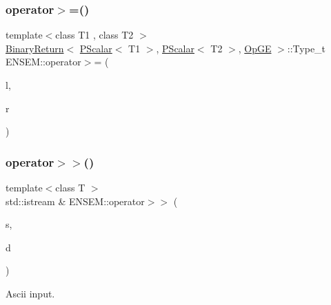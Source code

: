 \mbox{\label{group__primscalar_ga149cf6b2bcbe466aae6c6e90ee265c50}} 
\subsubsection{\texorpdfstring{operator$>$=()}{operator>=()}}
{\footnotesize\ttfamily template$<$class T1 , class T2 $>$ \\
\mbox{\hyperlink{structENSEM_1_1BinaryReturn}{Binary\+Return}}$<$ \mbox{\hyperlink{classENSEM_1_1PScalar}{P\+Scalar}}$<$ T1 $>$, \mbox{\hyperlink{classENSEM_1_1PScalar}{P\+Scalar}}$<$ T2 $>$, \mbox{\hyperlink{structENSEM_1_1OpGE}{Op\+GE}} $>$\+::Type\+\_\+t E\+N\+S\+E\+M\+::operator$>$= (\begin{DoxyParamCaption}\item[{const \mbox{\hyperlink{classENSEM_1_1PScalar}{P\+Scalar}}$<$ T1 $>$ \&}]{l,  }\item[{const \mbox{\hyperlink{classENSEM_1_1PScalar}{P\+Scalar}}$<$ T2 $>$ \&}]{r }\end{DoxyParamCaption})\hspace{0.3cm}{\ttfamily [inline]}}

\mbox{\label{group__primscalar_gae4d02a7c5e314405b8a8efa45f1f7e62}} 
\subsubsection{\texorpdfstring{operator$>$$>$()}{operator>>()}\hspace{0.1cm}{\footnotesize\ttfamily [1/3]}}
{\footnotesize\ttfamily template$<$class T $>$ \\
std\+::istream \& E\+N\+S\+E\+M\+::operator$>$$>$ (\begin{DoxyParamCaption}\item[{std\+::istream \&}]{s,  }\item[{\mbox{\hyperlink{classENSEM_1_1PScalar}{P\+Scalar}}$<$ T $>$ \&}]{d }\end{DoxyParamCaption})\hspace{0.3cm}{\ttfamily [inline]}}



Ascii input. 

